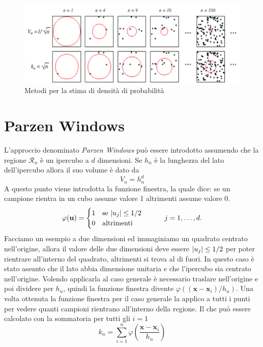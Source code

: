 \begin{figure}
\centering
\includegraphics[scale=0.5]{img/px.png}
\caption{Metodi per la stima di densità di probabilità}
\label{px}
\end{figure}

\section{Parzen Windows}
L'approccio denominato \emph{Parzen Windows} può essere introdotto assumendo che la regione $\mathcal{R}_n$ è un ipercubo a $d$ dimensioni. Se $h_n$ è la lunghezza del lato dell'ipercubo allora il suo volume è dato da
\begin{equation}
V_n = h_n^d
\end{equation}
A questo punto viene introdotta la funzione finestra, la quale dice: se un campione rientra in un cubo assume valore 1 altrimenti assume valore 0.  
\[
\varphi(\mathbf{u})=
\begin{cases}
1 & \text{se} \ \lvert u_j\rvert \leq 1/2\\
0 & \text{altrimenti}
\end{cases} 
\quad \quad \quad
j = 1, \dots, d.
\]
Facciamo un esempio a due dimensioni ed immaginiamo un quadrato centrato nell'origine, allora il valore delle due dimensioni deve essere $\lvert u_j\rvert \leq 1/2$ per poter rientrare all'interno del quadrato, altrimenti si trova al di fuori. In questo caso è stato assunto che il lato abbia dimensione unitaria e che l'ipercubo sia centrato nell'origine. Volendo applicarla al caso generale è necessario traslare nell'origine e poi dividere per $h_n$, quindi la funzione finestra divente $\varphi((\mathbf{x} - \mathbf{x}_i)/h_n)$. Una volta ottenuta la funzione finestra per il caso generale la applico a tutti i punti per vedere quanti campioni rientrano all'interno della regione. Il che può essere calcolato con la sommatoria per tutti gli $i=1$
\begin{equation}
k_n = \sum_{i=1}^n \varphi \left ( \frac{\mathbf{x} - \mathbf{x}_i}{h_n} \right )
\end{equation}
